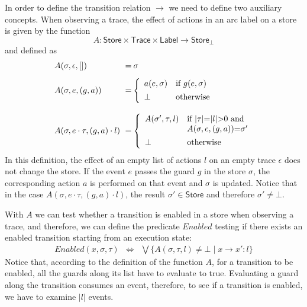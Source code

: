 \documentclass[10pt, preprint]{sigplanconf} %
\newcommand{\noterg}[2]{\textcolor{gray}{[\textcolor{red}{#1}: #2]}}
\newcommand{\rlp}[1]{\noterg{rlp}{#1}}
\newcommand{\set}[1]{\ensuremath{\mathsf{#1}}}
\begin{document}
In order to define the transition relation $\to$ we need to define two auxiliary concepts.
When observing a trace, the effect of actions in an arc label on a store  is given by the function
\[
   A : \set{Store} \times \set{Trace} \times \set{Label} \to \set{Store}_\bot
\] and defined as
\[
\begin{array}{l}
\begin{array}{l @{$\; =\;\;$} l}
A(\sigma,\epsilon,[]) &  \!\! \sigma
\\[2ex]
A(\sigma,e,(g,a)) & \!\! \left\{\begin{array}{ll}
     a(e,\sigma) & \mbox{if $g(e,\sigma)$}
     \\[1ex]
     \bot & \mbox{otherwise}
     \end{array}
     \right.
\\[5ex]
A(\sigma,e\cdot \tau,(g,a)\cdot l) & \!\! \left\{\begin{array}{ll}
     A(\sigma',\tau,l) & \mbox{if $|\tau|{=}|l|{>}0$ and }
     \\
& \mbox{$A(\sigma,e,(g,a)){=}\sigma'$}
     \\[1ex]
     \bot & \mbox{otherwise}
     \end{array}
     \right.
\end{array}
\end{array}\]
In this definition, the effect of an empty list of actions $l$ on an empty trace $\epsilon$ does not change the store.
If the event $e$ passes the guard $g$ in the store $\sigma$, the corresponding action $a$ is performed on that event 
and  $\sigma$ is updated. Notice that in  the case $A(\sigma,e\cdot \tau,(g,a)\cdot l)$, the result $\sigma' \in \set{Store}$ and therefore $\sigma' \neq \bot$. 

With $A$ we can test whether a
transition is enabled in a store when observing a trace, and therefore, we can define the
predicate $Enabled$ testing if there exists an enabled transition
starting from an execution state:
\begin{eqnarray*}
Enabled(x,\sigma,\tau) & \Leftrightarrow  & \bigvee \{ A(\sigma,\tau,l) \neq \bot \mid x \to x' : l \}
\end{eqnarray*}
Notice that, according to the definition of the function $A$, for a transition to be enabled, all the guards along its list have to evaluate to true.
Evaluating a guard along the transition consumes an event, therefore, to see if a transition is enabled, we have to examine $|l|$ events.
\end{document}
